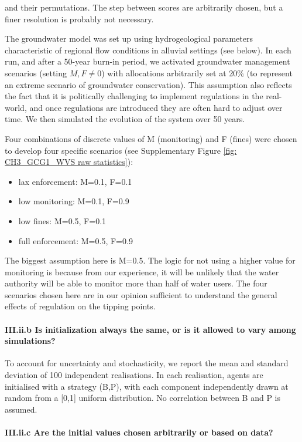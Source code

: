 \documentclass[12pt, a4paper]{article}
\begin{document}
and their permutations. The step between scores are arbitrarily chosen, but a finer resolution is probably not necessary.

The groundwater model was set up using hydrogeological parameters characteristic of regional flow conditions in alluvial settings (see below). In each run, and after a 50-year burn-in period, we activated groundwater management scenarios (setting $M,F \neq 0$) with allocations arbitrarily set at 20\% (to represent an extreme scenario of groundwater conservation). This assumption also reflects the fact that it is politically challenging to implement regulations in the real-world, and once regulations are introduced they are often hard to adjust over time. We then simulated the evolution of the system over 50 years.

Four combinations of discrete values of M (monitoring) and F (fines) were chosen to develop four specific scenarios (see Supplementary Figure \ref{fig: CH3_GCG1_WVS raw statistics}): 

\begin{itemize} \item lax enforcement: M=0.1, F=0.1 \item low monitoring: M=0.1, F=0.9 \item low fines: M=0.5, F=0.1 \item full enforcement: M=0.5, F=0.9 \end{itemize}

The biggest assumption here is M=0.5. The logic for not using a higher value for monitoring is because from our experience, it will be unlikely that the water authority will be able to monitor more than half of water users. The four scenarios chosen here are in our opinion sufficient to understand the general effects of regulation on the tipping points.

\paragraph{III.ii.b Is initialization always the same, or is it allowed to vary among simulations?}

To account for uncertainty and stochasticity, we report the mean and standard deviation of 100 independent realisations. In each realisation, agents are initialised with a strategy (B,P), with each component independently drawn at random from a [0,1] uniform distribution. No correlation between B and P is assumed.

\paragraph{III.ii.c Are the initial values chosen arbitrarily or based on data?}
\end{document}
